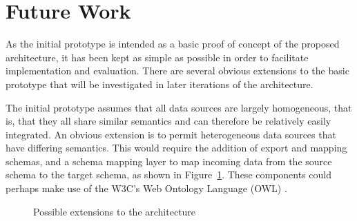 \documentclass{CRPITStyle}
\begin{document}
\section{Future Work}
\label{sec-future-work}

As the initial prototype is intended as a basic proof of concept of the
proposed architecture, it has been kept as simple as possible in order
to facilitate implementation and evaluation. There are several obvious
extensions to the basic prototype that will be investigated in later
iterations of the architecture.

The initial prototype assumes that all data sources are largely
homogeneous, that is, that they all share similar semantics and can
therefore be relatively easily integrated. An obvious extension is to
permit heterogeneous data sources that have differing semantics. This
would require the addition of export and mapping schemas, and a schema
mapping layer to map incoming data from the source schema to the target
schema, as shown in Figure~\ref{fig-extended}. These components could
perhaps make use of the W3C's Web Ontology Language (OWL)
\cite{McGu-DL-2004-OWL}.

\begin{figure}[htb]
	\caption{Possible extensions to the architecture}
	\label{fig-extended}
\end{figure}
\end{document}
